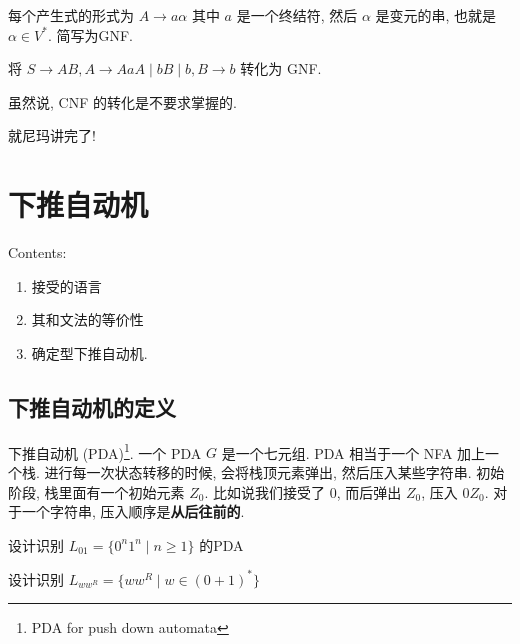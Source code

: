 \documentclass[../main.tex]{subfiles}
\begin{document}
\begin{definition}[格雷巴赫范式]\label{def:格雷巴赫范式}
	每个产生式的形式为 \(A \to a\alpha\) 其中 \(a\) 是一个终结符, 然后 \(\alpha\) 是变元的串, 也就是 \(\alpha \in  V ^{*}\). 简写为GNF. 
\end{definition}
\begin{exam}
将 \(S \to A B  , A \to Aa A \mid bB \mid b , B \to b\) 转化为 GNF.

虽然说, CNF 的转化是不要求掌握的. 
\end{exam}
就尼玛讲完了! 

\section{下推自动机}
\label{sec:下推自动机}

\noindent Contents:
\begin{enumerate}
	\item 接受的语言
	\item 其和文法的等价性
	\item 确定型下推自动机. 
\end{enumerate}

\subsection{下推自动机的定义}
\begin{definition}[下推自动机]\label{def:下推自动机}
	下推自动机 (PDA)\footnote{PDA for push down automata}. 一个 PDA \(G\) 是一个七元组. 
	PDA 相当于一个 NFA 加上一个栈. 进行每一次状态转移的时候, 会将栈顶元素弹出, 然后压入某些字符串. 
	初始阶段, 栈里面有一个初始元素 \(Z_{0}\). 比如说我们接受了 \(0\), 而后弹出 \(Z_{0}\), 压入 \(0Z_{0}\). 对于一个字符串, 压入顺序是\textbf{从后往前的}. 
\end{definition}

\begin{exam}
	设计识别 \(L _{01} = \{ 0 ^{n} 1 ^{n} \mid n \ge 1 \} \) 的PDA
\end{exam}

\begin{exam}
	设计识别 \(L _{w w ^{R}}= \{ w w ^{R} \mid w \in ( 0 + 1) ^{*} \}\)
\end{exam}

\end{document}
